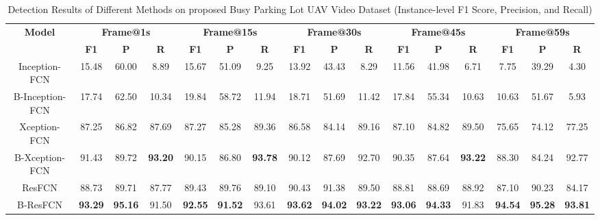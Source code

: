 \documentclass[journal]{IEEEtran}
\begin{document}
\begin{table*}[t]
\caption{\label{tab:det_parkinglot} Detection Results of Different Methods on proposed Busy Parking Lot UAV Video Dataset (Instance-level F1 Score, Precision, and Recall)}
\centering
\begin{tabular}{cccccccccccccccc}
\toprule
\multirow{2}{*}{\textbf{Model}} & \multicolumn{3}{c}{\textbf{Frame@1s}} & \multicolumn{3}{c}{\textbf{Frame@15s}} & \multicolumn{3}{c}{\textbf{Frame@30s}} & \multicolumn{3}{c}{\textbf{Frame@45s}} & \multicolumn{3}{c}{\textbf{Frame@59s}} \\
\cline{2-16}
 & \textbf{F1} & \textbf{P} & \textbf{R} & \textbf{F1} & \textbf{P} & \textbf{R} & \textbf{F1} & \textbf{P} & \textbf{R} & \textbf{F1} & \textbf{P} & \textbf{R} & \textbf{F1} & \textbf{P} & \textbf{R} \\
\hline
Inception-FCN & 15.48 & 60.00 & 8.89 & 15.67 & 51.09 & 9.25 & 13.92 & 43.43 & 8.29 & 11.56 & 41.98 & 6.71 & 7.75 & 39.29 & 4.30 \\
B-Inception-FCN & 17.74 & 62.50 & 10.34 & 19.84 & 58.72 & 11.94 & 18.71 & 51.69 & 11.42 & 17.84 & 55.34 & 10.63 & 10.63 & 51.67 & 5.93 \\
Xception-FCN & 87.25 & 86.82 & 87.69 & 87.27 & 85.28 & 89.36 & 86.58 & 84.14 & 89.16 & 87.10 & 84.82 & 89.50 & 75.65 & 74.12 & 77.25 \\
B-Xception-FCN & 91.43 & 89.72 & \textbf{93.20} & 90.15 & 86.80 & \textbf{93.78} & 90.12 & 87.69 & 92.70 & 90.35 & 87.64 & \textbf{93.22} & 88.30 & 84.24 & 92.77 \\
ResFCN & 88.73 & 89.71 & 87.77 & 89.43 & 89.76 & 89.10 & 90.43 & 91.38 & 89.50 & 88.81 & 88.69 & 88.92 & 87.10 & 90.23 & 84.17 \\
B-ResFCN & \textbf{93.29} & \textbf{95.16} & 91.50 & \textbf{92.55} & \textbf{91.52} & 93.61 & \textbf{93.62} & \textbf{94.02} & \textbf{93.22} & \textbf{93.06} & \textbf{94.33} & 91.83 & \textbf{94.54} & \textbf{95.28} & \textbf{93.81} \\
\bottomrule
\end{tabular}
\end{table*}
\end{document}
